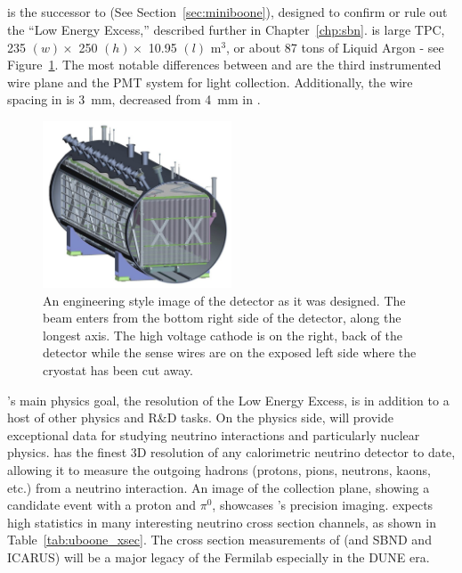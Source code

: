 \subsection{\label{sec:microboone} \uboone}

\uboone is the successor to \MB \cite{miniboone} (See Section~\ref{sec:miniboone}), designed to confirm or rule out the \MB ``Low Energy Excess,'' described further in Chapter~\ref{chp:sbn}.  \uboone is large TPC, 235 $ (w) \times $ 250 $ (h) \times $ 10.95 $ (l) $ m$^3$, or about 87 tons of Liquid Argon - see Figure~\ref{fig:uboone_det}.  The most notable differences between \argoneut and \uboone are the third instrumented wire plane and the PMT system for light collection.  Additionally, the wire spacing in \uboone is 3~mm, decreased from 4~mm in \argoneut.

\begin{figure}[h]
  \centering
  \includegraphics[width=0.5\textwidth]{lartpc_figures/uboone_tpc.jpg}
  \caption[\uboone Detector Design]{An engineering style image of the \uboone detector as it was designed.  The beam enters from the bottom right side of the detector, along the longest axis.  The high voltage cathode is on the right, back of the detector while the sense wires are on the exposed left side where the cryostat has been cut away.}
  \label{fig:uboone_det}
\end{figure}

\uboone's main physics goal, the resolution of the Low Energy Excess, is in addition to a host of other physics and R\&D tasks.  On the physics side, \uboone will provide exceptional data for studying neutrino interactions and particularly nuclear physics.  \uboone has the finest 3D resolution of any calorimetric neutrino detector to date, allowing it to measure the outgoing hadrons (protons, pions, neutrons, kaons, etc.) from a neutrino interaction.  An image of the \uboone collection plane, showing a \numu candidate event with a proton and $\pi^0$, showcases \uboone's precision imaging.  \uboone expects high statistics in many interesting neutrino cross section channels, as shown in Table~\ref{tab:uboone_xsec}.  The cross section measurements of \uboone (and SBND and ICARUS) will be a major legacy of the Fermilab \lartpcs especially in the DUNE\cite{DUNE} era.


